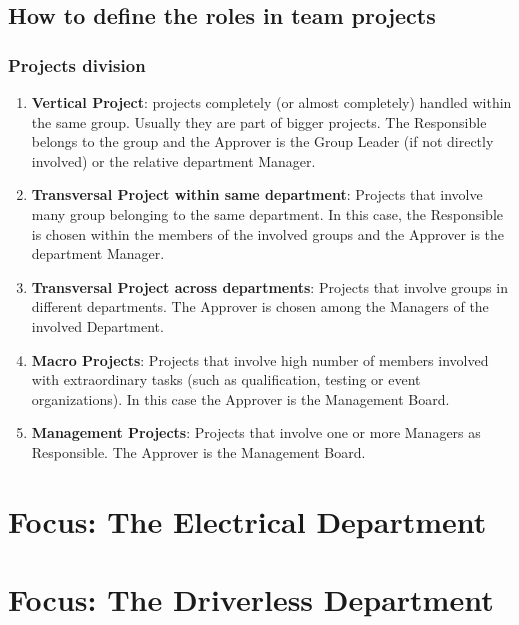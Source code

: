 \documentclass[graybox]{svmult}
\begin{document}
\subsection{How to define the roles in team projects}
\subsubsection{Projects division}
\begin{enumerate}
\item \textbf{Vertical Project}: projects completely (or almost completely) handled within the same group. Usually they are part of bigger projects. The Responsible belongs to the group and the Approver is the Group Leader (if not directly involved) or the relative department Manager.
\item \textbf{Transversal Project within same department}: Projects that involve many group belonging to the same department. In this case, the Responsible is chosen within the members of the involved groups and the Approver is the department Manager.
\item \textbf{Transversal Project across departments}: Projects that involve groups in different departments. The Approver is chosen among the Managers of the involved Department.
\item \textbf{Macro Projects}: Projects that involve high number of members involved with extraordinary tasks (such as qualification, testing or event organizations). In this case the Approver is the Management Board.
\item \textbf{Management Projects}: Projects that involve one or more Managers as Responsible. The Approver is the Management Board.
\end{enumerate}

\section{Focus: The Electrical Department}

\section{Focus: The Driverless Department}
\label{sec:4}
\end{document}
